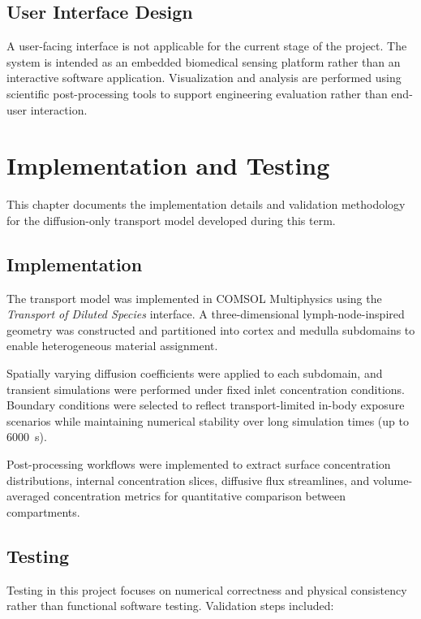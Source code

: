 \documentclass[12pt,a4paper]{report}
\begin{document}
\section{User Interface Design}

A user-facing interface is not applicable for the current stage of the project. The system is intended as an embedded biomedical sensing platform rather than an interactive software application. Visualization and analysis are performed using scientific post-processing tools to support engineering evaluation rather than end-user interaction.

\chapter{Implementation and Testing}

This chapter documents the implementation details and validation methodology for the diffusion-only transport model developed during this term.

\section{Implementation}

The transport model was implemented in COMSOL Multiphysics using the \textit{Transport of Diluted Species} interface. A three-dimensional lymph-node-inspired geometry was constructed and partitioned into cortex and medulla subdomains to enable heterogeneous material assignment.

Spatially varying diffusion coefficients were applied to each subdomain, and transient simulations were performed under fixed inlet concentration conditions. Boundary conditions were selected to reflect transport-limited in-body exposure scenarios while maintaining numerical stability over long simulation times (up to 6000~s).

Post-processing workflows were implemented to extract surface concentration distributions, internal concentration slices, diffusive flux streamlines, and volume-averaged concentration metrics for quantitative comparison between compartments.

\section{Testing}

Testing in this project focuses on numerical correctness and physical consistency rather than functional software testing. Validation steps included:
\end{document}
